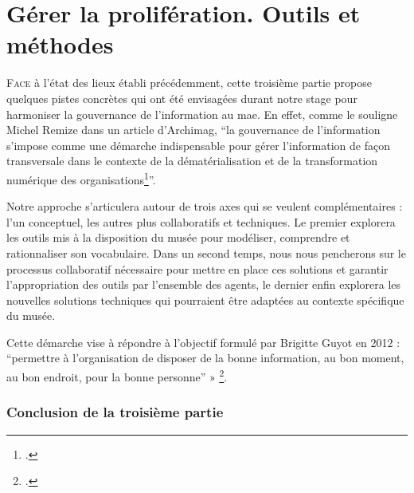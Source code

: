\documentclass[12pt,twoside]{book}
\newcommand{\mae}{\ac{mae}}
\begin{document}
	
	\part{Gérer la prolifération. Outils et méthodes}
	
	
	
	\lettrine{F}{ace} à l'état des lieux établi précédemment, cette troisième partie propose quelques pistes concrètes qui ont été envisagées durant notre stage pour harmoniser la gouvernance de l'information au \mae. En effet, comme le souligne Michel Remize dans un article d'Archimag, \enquote{la gouvernance de l'information s'impose comme une démarche indispensable pour gérer l'information de façon transversale dans le contexte de la dématérialisation et de la transformation numérique des organisations\footcite{remizeGouvernanceLinformationPlongez2022}}.
	
	Notre approche s'articulera autour de trois axes qui se veulent complémentaires : l'un conceptuel, les autres plus collaboratifs et techniques. Le premier explorera les outils mis à la disposition du musée pour modéliser, comprendre et rationnaliser son vocabulaire. Dans un second temps, nous nous pencherons sur le processus collaboratif nécessaire pour mettre en place ces solutions et garantir l'appropriation des outils par l'ensemble des agents, le dernier enfin explorera les nouvelles solutions techniques qui pourraient être adaptées au contexte spécifique du musée.
	
	Cette démarche vise à répondre à l'objectif formulé par Brigitte Guyot en 2012 : \enquote{permettre à l'organisation de disposer de la bonne information, au bon moment, au bon endroit, pour la bonne personne} » \footcite{guyotManagementLinformationDans}.
	
	
	
	
	
	
	
	
	\section*{Conclusion de la troisième partie}
	
\end{document}

